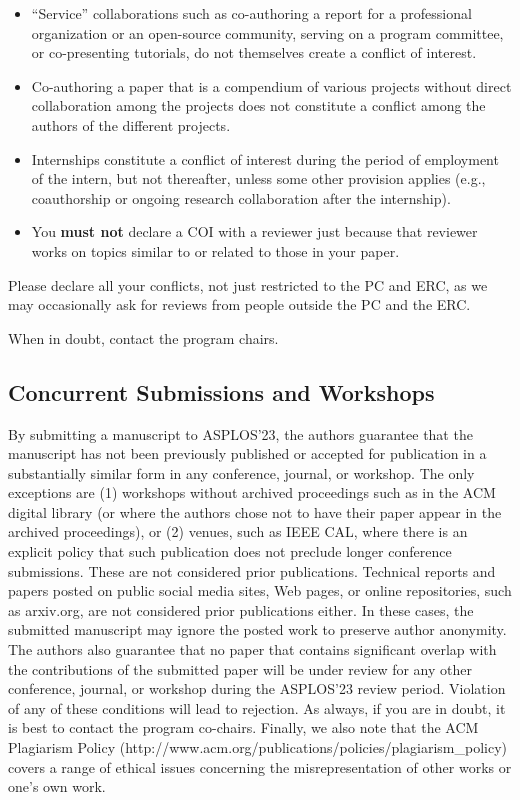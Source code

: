 \documentclass[pageno]{jpaper}
\begin{document}
\begin{itemize}
\item ``Service'' collaborations such as co-authoring a report for a professional
organization or an open-source community, serving on a program committee, or co-presenting
tutorials, do not themselves create a conflict of interest.

\item Co-authoring a paper that is a compendium of various projects without
direct collaboration among the projects does not constitute a
conflict among the authors of the different projects.

\item Internships constitute a conflict of interest during the period of employment of the intern, but not thereafter, unless some other provision applies (e.g., coauthorship or ongoing research collaboration after the internship).

\item You \textbf{must not} declare a COI with a reviewer just because that reviewer works on topics similar to or related to those in your paper. 

\end{itemize}

Please declare all your conflicts, not just restricted to the PC and ERC, as we may occasionally ask for reviews from people outside the PC and the ERC. 

When in doubt, contact the program chairs.

\subsection{Concurrent Submissions and Workshops}

By submitting a manuscript to ASPLOS'23, the authors guarantee that the
manuscript has not been previously published or accepted for publication in
a substantially similar form in any conference, journal, or workshop. The
only exceptions are (1) workshops without archived proceedings such as in
the ACM digital library (or where the authors chose not to have their paper
appear in the archived proceedings), or (2) venues, such as IEEE CAL, where
there is an explicit policy that such publication does not preclude longer
conference submissions. These are not considered prior publications. 
Technical reports and papers posted on public social media sites, Web pages,
or online repositories, such as arxiv.org, are not considered prior
publications either. In these cases, the submitted manuscript may
ignore the posted work to preserve author anonymity. 
The authors also guarantee that no paper that contains
significant overlap with the contributions of the submitted paper will be
under review for any other conference, journal, or workshop during the
ASPLOS'23 review period. Violation of any of these conditions will lead to
rejection. As always, if you are in doubt, it is best to contact the
program co-chairs.  Finally, we also note that the ACM Plagiarism Policy
(http://www.acm.org/publications/policies/plagiarism\_policy) covers a range
of ethical issues concerning the misrepresentation of other works or one's
own work.
\end{document}
